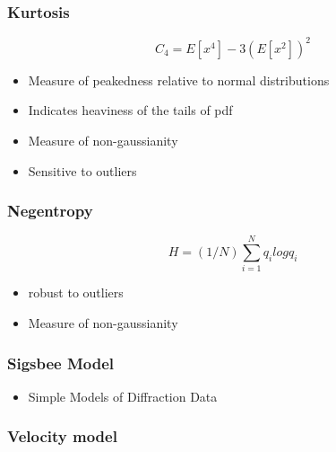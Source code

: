 \begin{frame} \frametitle{Kurtosis}

   \begin{equation} 
      C_4 = E[x^4] - 3(E[x^2])^2 
   \end{equation}
  \begin{itemize} 
    \item Measure of peakedness relative to normal distributions
    \item Indicates heaviness of the tails of pdf 
    \item Measure of non-gaussianity 
    \item Sensitive to outliers 
  \end{itemize}
\end{frame}
\begin{frame} \frametitle{Negentropy}

   \begin{equation} 
      H =(1/N) \sum_{i=1}^{N} q_i log q_i
   \end{equation}
  \begin{itemize} 
    \item robust to outliers
    \item Measure of non-gaussianity 
  \end{itemize}
\end{frame}
\begin{frame} 
   {}
\end{frame}
	

\begin{frame}
   {}
\end{frame}
\begin{frame} \frametitle{Sigsbee Model}

\begin{itemize}
   \item Simple Models of Diffraction Data 
\end{itemize}

\end{frame}
\begin{frame} \frametitle{Velocity model}
	 {}
	 {}
\end{frame}	

